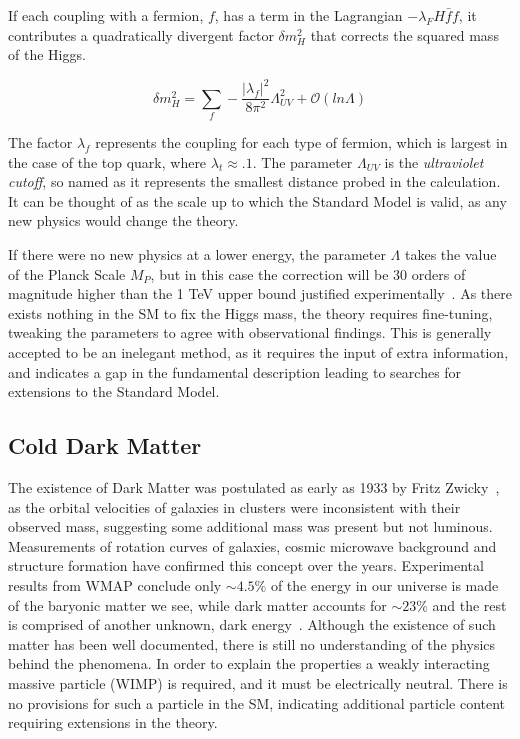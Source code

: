 If each coupling with a fermion, $f$, has a term in the Lagrangian $-\lambda_{F} H \bar{f}f$, it contributes a quadratically divergent factor $\delta m^{2}_{H}$ that corrects the squared mass of the Higgs. 

\begin{equation}
\delta m^{2}_{H} =\sum_{f} - \frac{|\lambda_{f}|^{2}}{8 \pi^{2}}\Lambda^{2}_{UV} + \mathcal{O}(ln\Lambda)
\label{eqn:HIGGQUAD}
\end{equation}

The factor $\lambda_{f}$  represents the coupling for each type of fermion, which is largest in the case of the top quark, where $\lambda_{t} \approx. 1$. The parameter $\Lambda_{UV}$ is the \textit{ultraviolet cutoff}, so named as it represents the smallest distance probed in the calculation. It can be thought of as the scale up to which the Standard Model is valid, as any new physics would change the theory.

 If there were no new physics at a lower energy, the parameter $\Lambda$ takes the value of the Planck Scale $M_{P}$, but in this case the correction will be 30 orders of magnitude higher than the 1 TeV upper bound justified experimentally~\cite{Drees}. As there exists nothing in the SM to fix the Higgs mass, the theory requires fine-tuning, tweaking the parameters to agree with observational findings. This is generally accepted to be an inelegant method, as it requires the input of extra information, and indicates a gap in the fundamental description leading to searches for extensions to the Standard Model. 

\subsection{Cold Dark Matter}

The existence of Dark Matter was postulated as early as 1933 by Fritz Zwicky~\cite{zwicky}, as the orbital velocities of galaxies in clusters were inconsistent with their observed mass, suggesting some additional mass was present but not luminous.  Measurements of rotation curves of galaxies, cosmic microwave background and structure formation have confirmed this concept over the years. Experimental results from WMAP conclude only $\sim 4.5\%$ of the energy in our universe is made of the baryonic matter we see, while dark matter accounts for $\sim 23\%$ and the rest is comprised of another unknown, dark energy~\cite{WMAP5}. Although the existence of such matter has been well documented, there is still no understanding of the physics behind the phenomena. In order to explain the properties a weakly interacting massive particle (WIMP) is required, and it must be electrically neutral. There is no provisions for such a particle in the SM, indicating additional particle content requiring extensions in the theory. 

